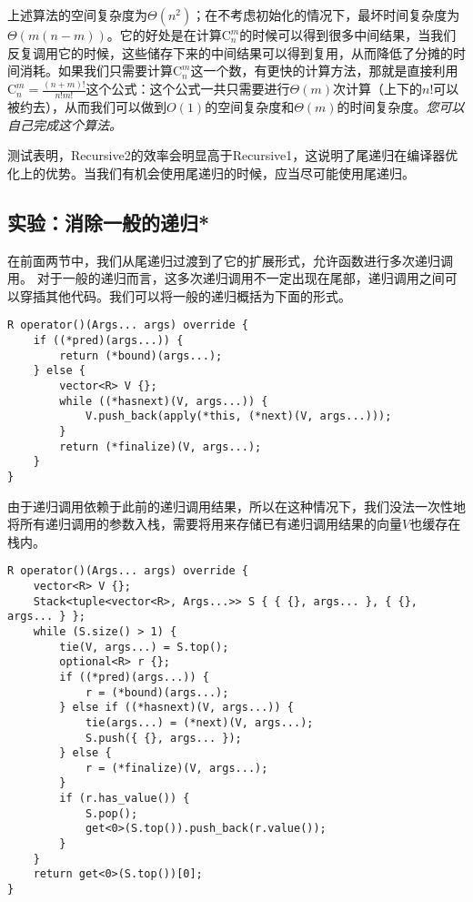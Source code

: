 上述算法的空间复杂度为$\Theta(n^2)$；在不考虑初始化的情况下，最坏时间复杂度为$\Theta(m(n-m))$。它的好处是在计算$\mathrm{C}_n^m$的时候可以得到很多中间结果，当我们反复调用它的时候，这些储存下来的中间结果可以得到复用，从而降低了分摊的时间消耗。如果我们只需要计算$\mathrm{C}_n^m$这一个数，有更快的计算方法，那就是直接利用$\mathrm{C}_n^m=\frac{(n+m)!}{n!m!}$这个公式：这个公式一共只需要进行$\Theta(m)$次计算（上下的$n!$可以被约去），从而我们可以做到$O(1)$的空间复杂度和$\Theta(m)$的时间复杂度。\textit{您可以自己完成这个算法。}

测试表明，Recursive2的效率会明显高于Recursive1，这说明了尾递归在编译器优化上的优势。当我们有机会使用尾递归的时候，应当尽可能使用尾递归。

\subsection{实验：消除一般的递归*}

在前面两节中，我们从尾递归过渡到了它的扩展形式，允许函数进行多次递归调用。
对于一般的递归而言，这多次递归调用不一定出现在尾部，递归调用之间可以穿插其他代码。我们可以将一般的递归概括为下面的形式。

\begin{lstlisting}
R operator()(Args... args) override {
    if ((*pred)(args...)) {
        return (*bound)(args...);
    } else {
        vector<R> V {};
        while ((*hasnext)(V, args...)) {
            V.push_back(apply(*this, (*next)(V, args...)));
        }
        return (*finalize)(V, args...);
    }
}
\end{lstlisting}

由于递归调用依赖于此前的递归调用结果，所以在这种情况下，我们没法一次性地将所有递归调用的参数入栈，需要将用来存储已有递归调用结果的向量$V$也缓存在栈内。

\begin{lstlisting}
R operator()(Args... args) override {
    vector<R> V {};
    Stack<tuple<vector<R>, Args...>> S { { {}, args... }, { {}, args... } };
    while (S.size() > 1) {
        tie(V, args...) = S.top();
        optional<R> r {};
        if ((*pred)(args...)) {
            r = (*bound)(args...);
        } else if ((*hasnext)(V, args...)) {
            tie(args...) = (*next)(V, args...);
            S.push({ {}, args... });
        } else {
            r = (*finalize)(V, args...);
        }
        if (r.has_value()) {
            S.pop();
            get<0>(S.top()).push_back(r.value());
        }
    }
    return get<0>(S.top())[0];
}
\end{lstlisting}

